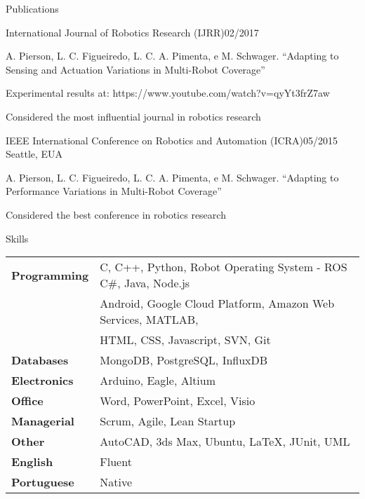 \documentclass[14pt, a4paper]{resume} %
\begin{document}
\begin{rSection}{Publications}
\begin{rSubsection}{International Journal of Robotics Research (IJRR)}{02/2017}{}{}
	
\item A. Pierson, L. C. Figueiredo, L. C. A. Pimenta, e M. Schwager. ``Adapting to Sensing and Actuation Variations in Multi-Robot Coverage''
\item Experimental results at: https://www.youtube.com/watch?v=qyYt3frZ7aw
\item Considered the most influential journal in robotics research
\end{rSubsection}

\begin{rSubsection}{IEEE International Conference on Robotics and Automation (ICRA)}{05/2015}{}{ \normalfont Seattle, EUA}

\item A. Pierson, L. C. Figueiredo, L. C. A. Pimenta, e M. Schwager. ``Adapting to Performance Variations in Multi-Robot Coverage''
\item Considered the best conference in robotics research

\end{rSubsection}

\end{rSection}


\begin{rSection}{Skills}

\begin{tabular}{ @{} >{\bfseries}l @{\hspace{6ex}} l }
Programming & C, C++, Python, Robot Operating System - ROS C\#, Java, Node.js
\\ & Android, Google Cloud Platform, Amazon Web Services, MATLAB,
\\ & HTML, CSS, Javascript, SVN, Git \\
Databases & MongoDB, PostgreSQL, InfluxDB \\
Electronics & Arduino, Eagle, Altium \\
Office & Word, PowerPoint, Excel, Visio \\
Managerial & Scrum, Agile, Lean Startup \\
Other & AutoCAD, 3ds Max, Ubuntu, LaTeX, JUnit, UML\\
English & Fluent \\
Portuguese & Native
\end{tabular}

\end{rSection}
\end{document}
